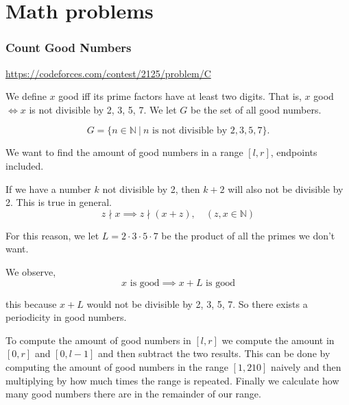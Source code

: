 \chapter{Math problems}

\subsection{Count Good Numbers}
\begin{sloppypar}
\url{https://codeforces.com/contest/2125/problem/C}
\end{sloppypar}

We define $x$ good iff its prime factors have at least two digits. That is, $x$ good $ \iff x $ is not divisible by 2, 3, 5, 7. We let $G$ be the set of all good numbers.

\begin{equation}
    G = \{n \in \mathbb{N}\ |\ n \text{ is not divisible by } 2, 3, 5, 7 \}.
\end{equation}

We want to find the amount of good numbers in a range $[l, r]$, endpoints included.

\begin{obs}
    If we have a number $k$ not divisible by 2, then $k + 2$ will also not be divisible by 2.
    This is true in general. \\
    \begin{equation*}
        z \nmid x \implies z \nmid (x + z), \quad (z, x \in \mathbb{N})
    \end{equation*}
\end{obs}

For this reason, we let $L = 2 \cdot 3 \cdot 5 \cdot 7$ be the product of all the primes we don't want.
\begin{obs}
    We observe,
    \begin{equation}
        x \text{ is good} \implies x + L \text{ is good} 
    \end{equation}

    this because $x + L$ would not be divisible by 2, 3, 5, 7. So there exists a periodicity in good numbers.
\end{obs}

\begin{idea}
    To compute the amount of good numbers in $[l, r]$ we compute the amount in $[0, r]$ and $[0, l-1]$ and then subtract the two results. This can be done by computing the amount of good numbers in the range $[1, 210]$ naively and then multiplying by how much times the range is repeated. Finally we calculate how many good numbers there are in the remainder of our range.
\end{idea}

